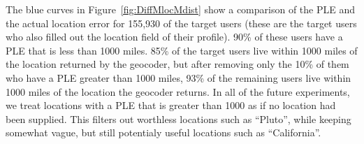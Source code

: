 The blue curves in Figure~\ref{fig:DiffMlocMdist} show a comparison of the PLE
and the actual location error for 155,930 of the target users (these are the
target users who also filled out the location field of their profile).
%
90\% of these users have a PLE that is less than 1000 miles.
%
85\% of the target users live within 1000 miles of the location returned by
the geocoder, but after removing only the 10\% of them who have a PLE greater
than 1000 miles, 93\% of the remaining users live within 1000 miles of the
location the geocoder returns.
%
In all of the future experiments, we treat locations with a PLE that is greater
than 1000 as if no location had been supplied.
%
This filters out worthless locations such as ``Pluto'', while keeping somewhat
vague, but still potentialy useful locations such as ``California''.
